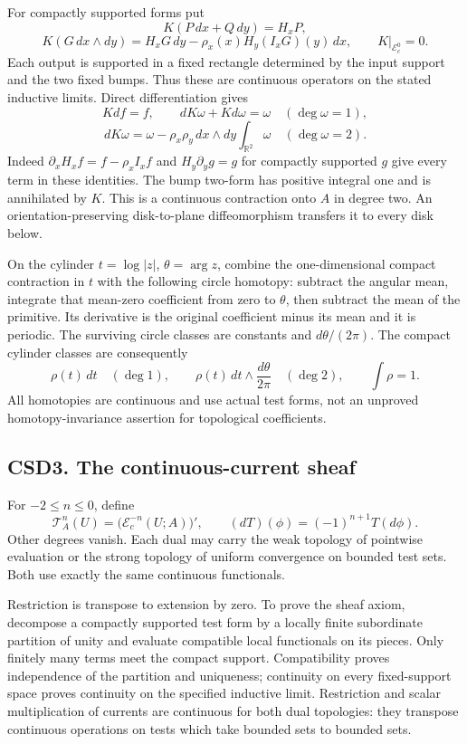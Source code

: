 For compactly supported forms put \[
K(P\,dx+Q\,dy)=H_xP,
\] \[
K(G\,dx\wedge dy)=H_xG\,dy-\rho_x(x)H_y(I_xG)(y)\,dx,
\qquad K|_{\mathcal E_c^0}=0.
\tag{CSD2.3}
\] Each output is supported in a fixed rectangle determined by the input
support and the two fixed bumps. Thus these are continuous operators on
the stated inductive limits. Direct differentiation gives \[
Kd f=f,\qquad dK\omega+Kd\omega=\omega\quad(\deg\omega=1),
\] \[
dK\omega=\omega-\rho_x\rho_y\,dx\wedge dy
\int_{\mathbb R^2}\omega\quad(\deg\omega=2).
\tag{CSD2.4}
\] Indeed \(\partial_xH_xf=f-\rho_xI_xf\) and \(H_y\partial_yg=g\) for
compactly supported \(g\) give every term in these identities. The bump
two-form has positive integral one and is annihilated by \(K\). This is
a continuous contraction onto \(A\) in degree two. An
orientation-preserving disk-to-plane diffeomorphism transfers it to
every disk below.

On the cylinder \(t=\log|z|\), \(\theta=\arg z\), combine the
one-dimensional compact contraction in \(t\) with the following circle
homotopy: subtract the angular mean, integrate that mean-zero
coefficient from zero to \(\theta\), then subtract the mean of the
primitive. Its derivative is the original coefficient minus its mean and
it is periodic. The surviving circle classes are constants and
\(d\theta/(2\pi)\). The compact cylinder classes are consequently \[
\rho(t)\,dt\quad(\deg1),\qquad
\rho(t)\,dt\wedge\frac{d\theta}{2\pi}\quad(\deg2),\qquad \int\rho=1.
\tag{CSD2.5}
\] All homotopies are continuous and use actual test forms, not an
unproved homotopy-invariance assertion for topological coefficients.

\subsection{CSD3. The continuous-current
sheaf}\label{csd3.-the-continuous-current-sheaf}

For \(-2\le n\le0\), define \[
\mathscr T_A^n(U)=\bigl(\mathcal E_c^{-n}(U;A)\bigr)',
\qquad (dT)(\phi)=(-1)^{n+1}T(d\phi).
\tag{CSD3.1}
\] Other degrees vanish. Each dual may carry the weak topology of
pointwise evaluation or the strong topology of uniform convergence on
bounded test sets. Both use exactly the same continuous functionals.

Restriction is transpose to extension by zero. To prove the sheaf axiom,
decompose a compactly supported test form by a locally finite
subordinate partition of unity and evaluate compatible local functionals
on its pieces. Only finitely many terms meet the compact support.
Compatibility proves independence of the partition and uniqueness;
continuity on every fixed-support space proves continuity on the
specified inductive limit. Restriction and scalar multiplication of
currents are continuous for both dual topologies: they transpose
continuous operations on tests which take bounded sets to bounded sets.

